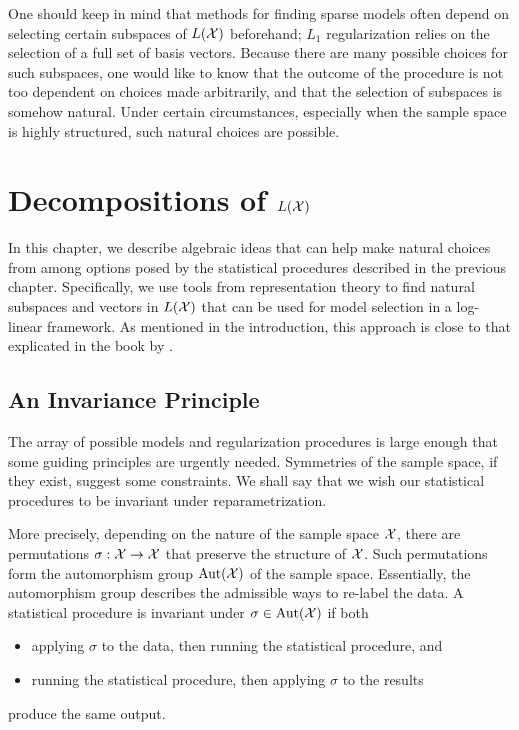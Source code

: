 \documentclass[cclicense]{hmcthesis}
\numberwithin{equation}{chapter}
\numberwithin{ucounter}{chapter}
\begin{document}
    One should keep in mind that methods for finding sparse models often depend
    on selecting certain subspaces of $L(\mathcal{X})$ beforehand; $L_1$ regularization
    relies on the selection of a full set of basis vectors.  Because there
    are many possible choices for such subspaces, one would like to know that
    the outcome of the procedure is not too dependent on choices made
    arbitrarily, and that the selection of subspaces is somehow natural.  Under
    certain circumstances, especially when the sample space is highly
    structured, such natural choices are possible.

\chapter{Decompositions of $L(\mathcal{X})$}

    In this chapter, we describe algebraic ideas that can help make natural
    choices from among options posed by the statistical procedures described in
    the previous chapter.  Specifically, we use tools from representation theory
    to find natural subspaces and vectors in $L(\mathcal{X})$ that can be used for model
    selection in a log-linear framework.  As mentioned in the introduction, this
    approach is close to that explicated in the book by \citet{GRPS}.

\section{An Invariance Principle}
    
    The array of possible models and regularization procedures is large enough
    that some guiding principles are urgently needed.  Symmetries of the sample
    space, if they exist, suggest some constraints.  We shall say that we wish
    our statistical procedures to be invariant under reparametrization.  

    More precisely, depending on the nature of the sample space $\mathcal{X}$, there are
    permutations $\sigma: \mathcal{X} \to \mathcal{X}$ that preserve the structure of $\mathcal{X}$.
    Such permutations form the automorphism group $\operatorname{Aut}(\mathcal{X})$ of the sample
    space.  Essentially, the automorphism group describes the admissible ways to
    re-label the data.  A statistical procedure is invariant under $\sigma \in
    \operatorname{Aut}(\mathcal{X})$ if both
    \begin{itemize}\noparspace
    \item applying $\sigma$ to the data, then running the statistical procedure,
    and
    \item running the statistical procedure, then applying $\sigma$ to the
    results
    \end{itemize}
    produce the same output.
\end{document}
